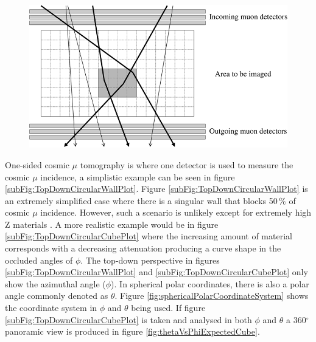 \begin{figure}[!h]
 \centering
 \includegraphics[width=0.7\linewidth]{Chapter5/Figs/Raster/twoSidedCosmicMuon_schults2007.png}
 \label{fig:twoSidedCosmicMuonTomographySchults}
\end{figure}
 
 One-sided cosmic $\mu$ tomography is where one detector is used to measure the cosmic $\mu$ incidence, a simplistic example can be seen in figure \ref{subFig:TopDownCircularWallPlot}. Figure \ref{subFig:TopDownCircularWallPlot} is an extremely simplified case where there is a singular wall that blocks 50\,\% of cosmic $\mu$ incidence. However, such a scenario is unlikely except for extremely high Z materials \cite{schultz_2007}. A more realistic example would be in figure \ref{subFig:TopDownCircularCubePlot} where the increasing amount of material corresponds with a decreasing attenuation producing a curve shape in the occluded angles of $\phi$. The top-down perspective in figures \ref{subFig:TopDownCircularWallPlot} and \ref{subFig:TopDownCircularCubePlot} only show the azimuthal angle ($\phi$). In spherical polar coordinates, there is also a polar angle commonly denoted as $\theta$. Figure \ref{fig:sphericalPolarCoordinateSystem} shows the coordinate system in $\phi$ and $\theta$ being used. If figure \ref{subFig:TopDownCircularCubePlot} is taken and analysed in both $\phi$ and $\theta$ a 360$^\circ$ panoramic view is produced in figure \ref{fig:thetaVsPhiExpectedCube}.
 
